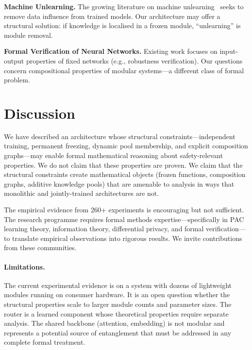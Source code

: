 \documentclass[11pt,a4paper]{article}
\begin{document}
\textbf{Machine Unlearning.} The growing literature on machine unlearning~\cite{bourtoule2021machine} seeks to remove data influence from trained models. Our architecture may offer a structural solution: if knowledge is localised in a frozen module, ``unlearning'' is module removal.

\textbf{Formal Verification of Neural Networks.} Existing work focuses on input-output properties of fixed networks (e.g., robustness verification). Our questions concern compositional properties of modular systems---a different class of formal problem.

\section{Discussion}
\label{sec:discussion}

We have described an architecture whose structural constraints---independent training, permanent freezing, dynamic pool membership, and explicit composition graphs---may enable formal mathematical reasoning about safety-relevant properties.
We do not claim that these properties are proven.
We claim that the structural constraints create mathematical objects (frozen functions, composition graphs, additive knowledge pools) that are amenable to analysis in ways that monolithic and jointly-trained architectures are not.

The empirical evidence from 260+ experiments is encouraging but not sufficient.
The research programme requires formal methods expertise---specifically in PAC learning theory, information theory, differential privacy, and formal verification---to translate empirical observations into rigorous results.
We invite contributions from these communities.

\paragraph{Limitations.}
The current experimental evidence is on a system with dozens of lightweight modules running on consumer hardware.
It is an open question whether the structural properties scale to larger module counts and parameter sizes.
The router is a learned component whose theoretical properties require separate analysis.
The shared backbone (attention, embedding) is not modular and represents a potential source of entanglement that must be addressed in any complete formal treatment.
\end{document}
